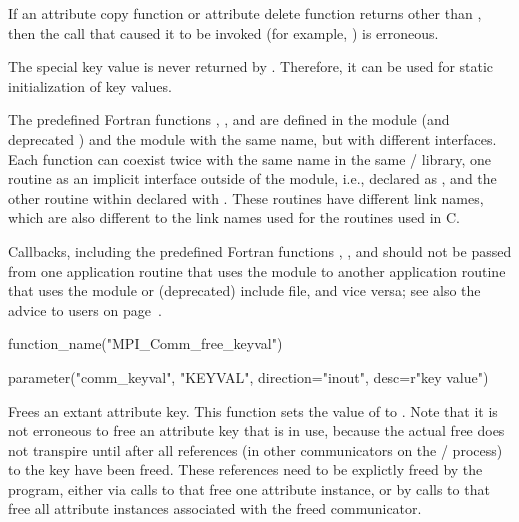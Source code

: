 If an attribute copy function or attribute delete function returns other than
, then the call that caused it to be invoked (for example,
) is erroneous.


The special key value  is never returned
by . Therefore, it can be used for
static initialization of key values.

\begin{implementors}
\label{advice:context:predefined:Fortran:implementors}%
The predefined Fortran functions ,
,
and \vlgb{} are defined
in the  module (and deprecated \gb{}) and the  module
with the same name, but with different interfaces.
Each function can coexist twice with the same name in the same \MPI/ library,
one routine as an implicit interface outside of the  module,
i.e., declared as ,
and the other routine within  declared with .
These routines have different link names, which are also different
to the link names used for the routines used in C.
\end{implementors}

\begin{users}
\label{advice:context:predefined:Fortran:users}%
Callbacks, including the predefined Fortran functions
, ,
and \vlgb{} should not be passed from one application
routine that uses the  module to another
application routine that uses the  module or (deprecated)  include file,
and vice versa;
see also the advice to users on page~\pageref{advice:bindings:predefined:Fortran:users}.
\end{users}

\begin{mpi-binding}
    function_name("MPI_Comm_free_keyval")
    
    parameter("comm_keyval", "KEYVAL", direction="inout", desc=r"key value")
\end{mpi-binding}

Frees an extant attribute key.
This function sets the value of  to
.
Note that it is not erroneous to free an attribute key
that is in use, because the actual free does not transpire until after all
references (in other communicators on the \MPI/ process) to the key have been freed.
These references need to be explictly freed by the program, either via calls
to  that free one attribute instance, or by calls
to  that free all attribute instances associated with
the freed communicator.


